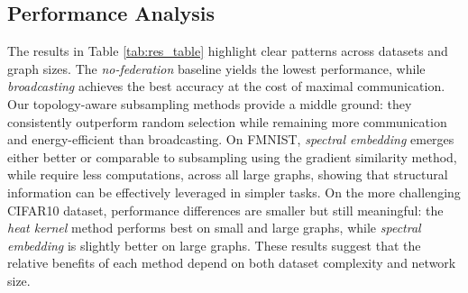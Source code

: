 \documentclass[journal]{IEEEtran}
\begin{document}
\subsection{Performance Analysis} 
\label{sec:res}
The results in Table \ref{tab:res_table} highlight clear patterns across datasets and graph sizes. The \textit{no-federation} baseline yields the lowest performance, while \textit{broadcasting} achieves the best accuracy at the cost of maximal communication. Our topology-aware subsampling methods provide a middle ground: they consistently outperform random selection while remaining more communication and energy-efficient than broadcasting. On FMNIST, \textit{spectral embedding} emerges either better or comparable to subsampling using the gradient similarity method, while require less computations, across all large graphs, showing that structural information can be effectively leveraged in simpler tasks. On the more challenging CIFAR10 dataset, performance differences are smaller but still meaningful: the \textit{heat kernel} method performs best on small and large graphs, while \textit{spectral embedding} is slightly better on large graphs. These results suggest that the relative benefits of each method depend on both dataset complexity and network size.
\end{document}
